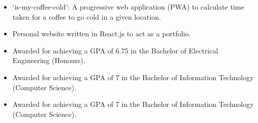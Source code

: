 
	

	\begin{itemize}
		\item `is-my-coffee-cold': A progressive web application (PWA) to calculate time taken for a coffee to go cold in a given location.		
		\item Personal website written in React.js to act as a portfolio.
	\end{itemize}

	\begin{itemize}
		\item Awarded for achieving a GPA of 6.75 in the Bachelor of Electrical Engineering
 (Honours).
	\end{itemize}
	\begin{itemize}
		\item Awarded for achieving a GPA of 7 in the Bachelor of Information Technology
 (Computer Science).
	\end{itemize}
	\begin{itemize}
		\item Awarded for achieving a GPA of 7 in the Bachelor of Information Technology
 (Computer Science).
	\end{itemize}

